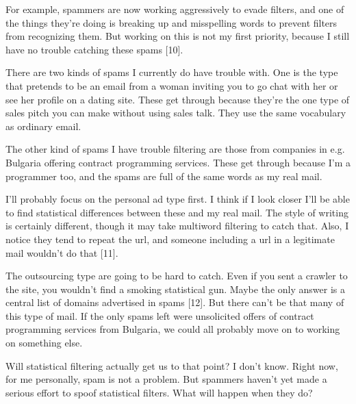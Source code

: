For example, spammers are now
                  working aggressively to evade filters, and one of the things
                  they're doing is breaking up and misspelling words to prevent
                  filters from recognizing them. But working on this is not my
                  first priority, because I still have no trouble catching these
                  spams [10].

There are two kinds of spams I
                  currently do have trouble with. One is the type that pretends
                  to be an email from a woman inviting you to go chat with her
                  or see her profile on a dating site. These get through because
                  they're the one type of sales pitch you can make without using
                  sales talk. They use the same vocabulary as ordinary email.

The
                  other kind of spams I have trouble filtering are those from
                  companies in e.g. Bulgaria offering contract programming
                  services. These get through because I'm a programmer too, and
                  the spams are full of the same words as my real mail.

I'll
                  probably focus on the personal ad type first. I think if I
                  look closer I'll be able to find statistical differences
                  between these and my real mail. The style of writing is
                  certainly different, though it may take multiword filtering to
                  catch that. Also, I notice they tend to repeat the url, and
                  someone including a url in a legitimate mail wouldn't do that
                  [11].

The outsourcing type are going to be hard to
                  catch. Even if you sent a crawler to the site, you wouldn't
                  find a smoking statistical gun. Maybe the only answer is a
                  central list of domains advertised in spams [12]. But there
                  can't be that many of this type of mail. If the only spams
                  left were unsolicited offers of contract programming services
                  from Bulgaria, we could all probably move on to working on
                  something else.

Will statistical filtering actually
                  get us to that point? I don't know. Right now, for me
                  personally, spam is not a problem. But spammers haven't yet
                  made a serious effort to spoof statistical filters. What will
                  happen when they do?

